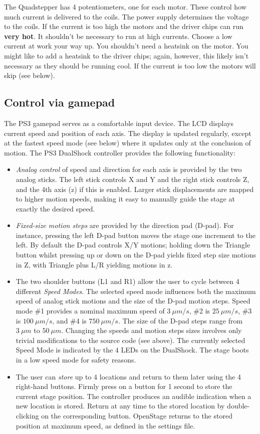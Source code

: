 \documentclass[11pt]{report} %
\begin{document}
The Quadstepper has 4 potentiometers, one for each motor. These control how much current is delivered to the coils. The power supply determines the voltage to the coils. If the current is too high the motors and the driver chips can run \textbf{very hot}. It shouldn't be necessary to run at high currents. Choose a low current at work your way up. You shouldn't need a heatsink on the motor. You might like to add a heatsink to the driver chips; again, however, this likely isn't necessary as they should be running cool. If the current is too low the motors will skip (see below).


\subsection{Control via gamepad}
The PS3 gamepad serves as a comfortable input device. The LCD displays current speed and position of each axis. The display is updated regularly, except at the fastest speed mode (see below) where it updates only at the conclusion of motion. 
The PS3 DualShock controller provides the following functionality:

\begin{itemize}
\item \textit{Analog control} of speed and direction for each axis is
  provided by the two analog sticks. The left stick controls X and Y and the right stick controls Z, and the 4th axis (z) if this is enabled. Larger stick displacements are mapped to higher motion speeds, making it easy to manually guide the stage at exactly the desired speed.
\item \textit{Fixed-size motion steps} are provided by the direction
  pad (D-pad). For instance,
  pressing the left D-pad button moves the stage one increment to the
  left. By default the D-pad controls X/Y motions; holding down the
  Triangle button whilst pressing up or down on the D-pad yields fixed
  step size motions in Z, with Triangle plus L/R yielding motions in z. 
\item The two shoulder buttons (L1 and R1) allow the user to cycle between 4
  different \textit{Speed Modes}. The selected speed mode influences
  both the maximum speed of analog stick motions and the size of the
  D-pad motion steps. Speed mode \#1 provides a nominal maximum speed
  of $3~\mu m/s$, \#2 is $25~\mu m/s$, \#3 is $100~\mu m/s$, and \#4 is
  $750~\mu m/s$. The size of the D-pad steps range from $3~\mu m$ to
  $50~\mu m$. Changing the speeds and motion steps sizes involves only
  trivial modifications to the source code (see above). The currently selected
  Speed Mode is indicated by the 4 LEDs on the DualShock. The stage boots in a low speed mode for safety reasons. 
\item The user can \textit{store} up to 4 locations and return to them
  later using the 4 right-hand buttons. Firmly press on a button for 1 second to store the current stage position. The controller produces an audible
  indication when a new location is stored. Return at any
  time to the stored location by double-clicking on the corresponding
  button. OpenStage returns to the stored position at maximum speed, as defined in the settings file. 
\end{itemize}
\end{document}
